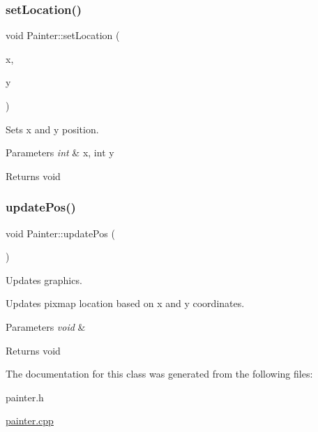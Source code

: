\subsubsection{\texorpdfstring{set\+Location()}{setLocation()}}
{\footnotesize\ttfamily void Painter\+::set\+Location (\begin{DoxyParamCaption}\item[{int}]{x,  }\item[{int}]{y }\end{DoxyParamCaption})}



Sets x and y position. 


\begin{DoxyParams}{Parameters}
{\em int} & x, int y \\
\hline
\end{DoxyParams}
\begin{DoxyReturn}{Returns}
void 
\end{DoxyReturn}
\mbox{\label{class_painter_a28975648307f4885c65769088dfc7236}} 
\subsubsection{\texorpdfstring{update\+Pos()}{updatePos()}}
{\footnotesize\ttfamily void Painter\+::update\+Pos (\begin{DoxyParamCaption}\item[{void}]{ }\end{DoxyParamCaption})}



Updates graphics. 

Updates pixmap location based on x and y coordinates. 
\begin{DoxyParams}{Parameters}
{\em void} & \\
\hline
\end{DoxyParams}
\begin{DoxyReturn}{Returns}
void 
\end{DoxyReturn}


The documentation for this class was generated from the following files\+:\begin{DoxyCompactItemize}
\item 
painter.\+h\item 
\mbox{\hyperlink{painter_8cpp}{painter.\+cpp}}\end{DoxyCompactItemize}
